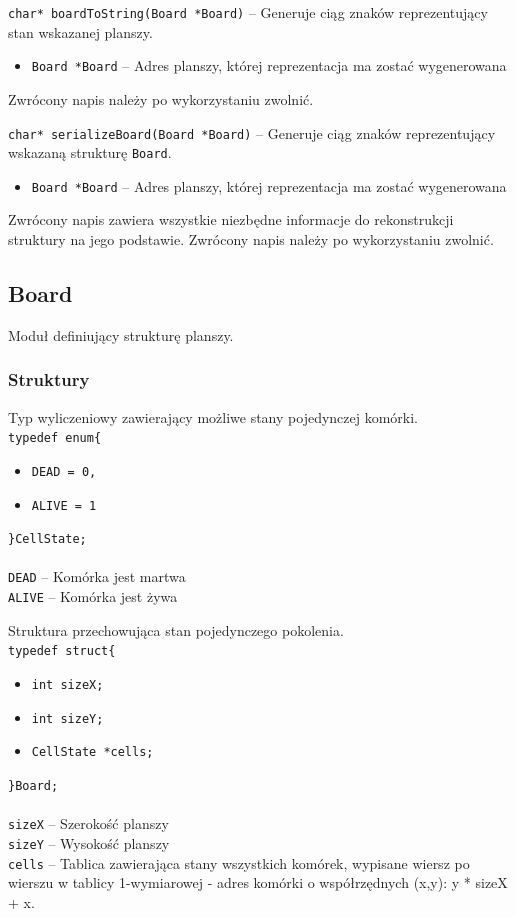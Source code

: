 \documentclass{article}
\begin{document}
\vspace{5mm}
\noindent{}\texttt{char* boardToString(Board *Board)} -- Generuje ciąg znaków reprezentujący stan wskazanej planszy.
\begin{itemize}[label={}]
	\item \texttt{Board *Board} -- Adres planszy, której reprezentacja ma zostać wygenerowana
\end{itemize}
Zwrócony napis należy po wykorzystaniu zwolnić.

\vspace{5mm}
\noindent{}\texttt{char* serializeBoard(Board *Board)} -- Generuje ciąg znaków reprezentujący wskazaną strukturę \texttt{Board}.
\begin{itemize}[label={}]
	\item \texttt{Board *Board} -- Adres planszy, której reprezentacja ma zostać wygenerowana
\end{itemize}
Zwrócony napis zawiera wszystkie niezbędne informacje do rekonstrukcji struktury na jego podstawie. Zwrócony napis należy po wykorzystaniu zwolnić.

\subsection{Board}
Moduł definiujący strukturę planszy.

\subsubsection{Struktury}
Typ wyliczeniowy zawierający możliwe stany pojedynczej komórki. \\
\texttt{typedef enum\{}
\begin{itemize}[label={}, noitemsep, topsep=0pt]
	\item \texttt{DEAD = 0,}
	\item \texttt{ALIVE = 1}
\end{itemize}
\texttt{\}CellState;}\\\\
\texttt{DEAD} -- Komórka jest martwa \\
\texttt{ALIVE} -- Komórka jest żywa

\vspace{5mm}

\noindent{}Struktura przechowująca stan pojedynczego pokolenia. \\
\texttt{typedef struct\{}
\begin{itemize}[label={}, noitemsep, topsep=0pt]
	\item \texttt{int sizeX;}
	\item \texttt{int sizeY;}
	\item \texttt{CellState *cells;}
\end{itemize}
\texttt{\}Board;\\} \\
\texttt{sizeX} -- Szerokość planszy \\
\texttt{sizeY} -- Wysokość planszy \\
\texttt{cells} -- Tablica zawierająca stany wszystkich komórek, wypisane wiersz po wierszu w tablicy 1-wymiarowej - adres komórki o współrzędnych (x,y): y * sizeX + x.
\end{document}
